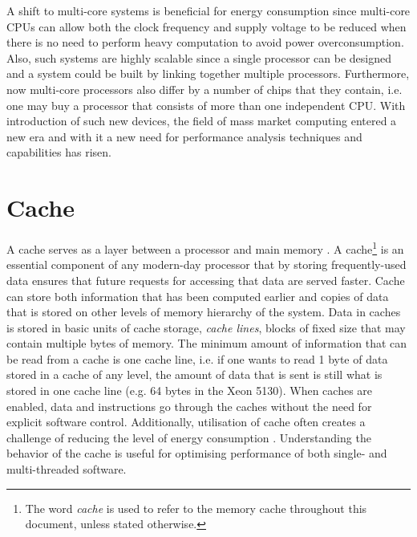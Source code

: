 A shift to multi-core systems is beneficial for energy consumption since multi-core CPUs can allow both the clock frequency and supply voltage to be reduced when there is no need to perform heavy computation to avoid power overconsumption. Also, such systems are highly scalable since a single processor can be designed and a system could be built by linking together multiple processors. Furthermore, now multi-core processors also differ by a number of chips that they contain, i.e. one may buy a processor that consists of more than one independent CPU. With introduction of such new devices, the field of mass market computing entered a new era and with it a new need for performance analysis techniques and capabilities has risen.

\section{Cache}
\label{cacheLit}

A cache serves as a layer between a processor and main memory \cite{Langston2007}. A cache\footnote{The word \textit{cache} is used to refer to the memory cache throughout this document, unless stated otherwise.} is an essential component of any modern-day processor that by storing frequently-used data ensures that future requests for accessing that data are served faster. Cache can store both information that has been computed earlier and copies of data that is stored on other levels of memory hierarchy of the system. Data in caches is stored in basic units of cache storage, \textit{cache lines}, blocks of fixed size that may contain multiple bytes of memory. The minimum amount of information that can be read from a cache is one cache line, i.e. if one wants to read 1 byte of data stored in a cache of any level, the amount of data that is sent is still what is stored in one cache line (e.g. 64 bytes in the Xeon 5130). When caches are enabled, data and instructions go through the caches without the need for explicit software control. Additionally, utilisation of cache often creates a challenge of reducing the level of energy consumption \cite{Su1995}. Understanding the behavior of the cache is useful for optimising performance of both single- and multi-threaded software.

